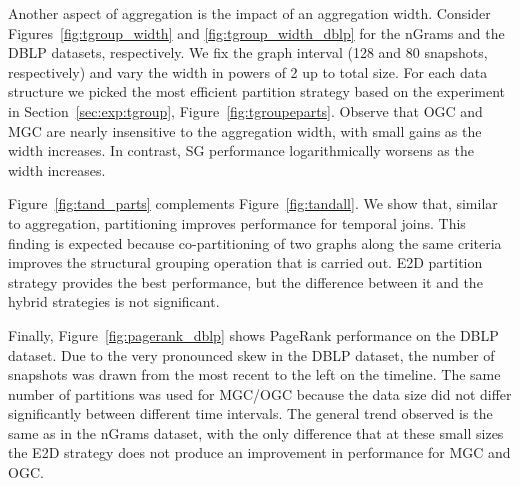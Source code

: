Another aspect of aggregation is the impact of an aggregation width.
Consider Figures~\ref{fig:tgroup_width} and
\ref{fig:tgroup_width_dblp} for the nGrams and the DBLP datasets,
respectively.  We fix the graph interval (128 and 80 snapshots,
respectively) and vary the width in powers of 2 up to total size.  For
each data structure we picked the most efficient partition strategy
based on the experiment in Section~\ref{sec:exp:tgroup},
Figure~\ref{fig:tgroupeparts}.  Observe that OGC and MGC are nearly
insensitive to the aggregation width, with small gains as the width
increases.  In contrast, SG performance logarithmically worsens as the
width increases.

Figure~\ref{fig:tand_parts} complements Figure~\ref{fig:tandall}.  We
show that, similar to aggregation, partitioning improves performance
for temporal joins.  This finding is expected because co-partitioning
of two graphs along the same criteria improves the structural grouping
operation that is carried out. E2D partition strategy provides the
best performance, but the difference between it and the hybrid
strategies is not significant.

Finally, Figure~\ref{fig:pagerank_dblp} shows PageRank performance on
the DBLP dataset. Due to the very pronounced skew in the DBLP dataset,
the number of snapshots was drawn from the most recent to the left on
the timeline.  The same number of partitions was used for MGC/OGC
because the data size did not differ significantly between different
time intervals.  The general trend observed is the same as in the
nGrams dataset, with the only difference that at these small sizes the
E2D strategy does not produce an improvement in performance for MGC
and OGC.
